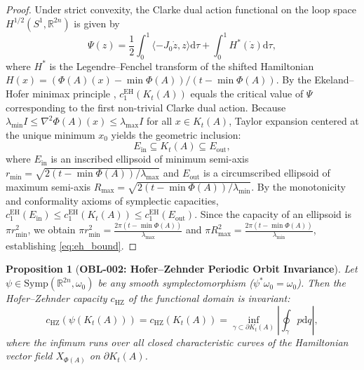 \documentclass[11pt,a4paper,reqno]{amsart}
\newtheorem{proposition}[theorem]{Proposition}
\theoremstyle{definition}
\theoremstyle{remark}
\numberwithin{equation}{section}
\newcommand{\dif}{\mathrm{d}}
\begin{document}
\begin{proof}
Under strict convexity, the Clarke dual action functional on the loop space $H^{1/2}(S^1, \mathbb{R}^{2n})$ is given by
\begin{equation}
\Psi(z) = \frac{1}{2} \int_0^1 \langle -J_0 \dot{z}, z \rangle \dif \tau + \int_0^1 H^*(\dot{z}) \dif \tau,
\end{equation}
where $H^*$ is the Legendre--Fenchel transform of the shifted Hamiltonian $H(x) = (\Phi(A)(x) - \min \Phi(A)) / (t - \min \Phi(A))$. By the Ekeland--Hofer minimax principle \cite{EkelandHofer1989}, $c_1^{\mathrm{EH}}(K_t(A))$ equals the critical value of $\Psi$ corresponding to the first non-trivial Clarke dual action. Because $\lambda_{\min} I \le \nabla^2 \Phi(A)(x) \le \lambda_{\max} I$ for all $x \in K_t(A)$, Taylor expansion centered at the unique minimum $x_0$ yields the geometric inclusion:
\begin{equation}
E_{\mathrm{in}} \subseteq K_t(A) \subseteq E_{\mathrm{out}},
\end{equation}
where $E_{\mathrm{in}}$ is an inscribed ellipsoid of minimum semi-axis $r_{\min} = \sqrt{2(t - \min \Phi(A)) / \lambda_{\max}}$ and $E_{\mathrm{out}}$ is a circumscribed ellipsoid of maximum semi-axis $R_{\max} = \sqrt{2(t - \min \Phi(A)) / \lambda_{\min}}$. By the monotonicity and conformality axioms of symplectic capacities, $c_1^{\mathrm{EH}}(E_{\mathrm{in}}) \le c_1^{\mathrm{EH}}(K_t(A)) \le c_1^{\mathrm{EH}}(E_{\mathrm{out}})$. Since the capacity of an ellipsoid is $\pi r_{\min}^2$, we obtain $\pi r_{\min}^2 = \frac{2\pi(t - \min \Phi(A))}{\lambda_{\max}}$ and $\pi R_{\max}^2 = \frac{2\pi(t - \min \Phi(A))}{\lambda_{\min}}$, establishing \eqref{eq:eh_bound}.
\end{proof}

\begin{proposition}[\textbf{OBL-002: Hofer--Zehnder Periodic Orbit Invariance}]
\label{prop:hz_symp_inv}
Let $\psi \in \mathrm{Symp}(\mathbb{R}^{2n}, \omega_0)$ be any smooth symplectomorphism ($\psi^* \omega_0 = \omega_0$). Then the Hofer--Zehnder capacity $c_{\mathrm{HZ}}$ of the functional domain is invariant:
\begin{equation}
c_{\mathrm{HZ}}(\psi(K_t(A))) = c_{\mathrm{HZ}}(K_t(A)) = \inf_{\gamma \subset \partial K_t(A)} \left| \oint_\gamma p \dif q \right|,
\end{equation}
where the infimum runs over all closed characteristic curves of the Hamiltonian vector field $X_{\Phi(A)}$ on $\partial K_t(A)$.
\end{proposition}
\end{document}
